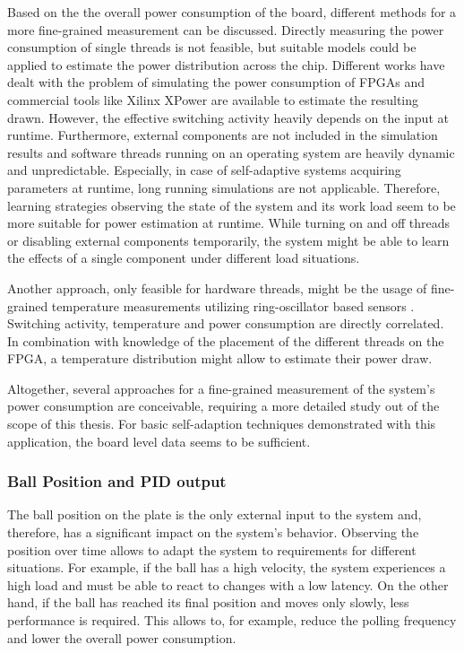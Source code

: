 Based on the the overall power consumption of the board, different methods for
a more fine-grained measurement can be discussed. Directly measuring the power
consumption of single threads is not feasible, but suitable models could be
applied to estimate the power distribution across the chip. Different works
have dealt with the problem of simulating the power consumption of \acp{FPGA}
\citep{DeTu05,JeCa11} and commercial tools like Xilinx XPower are available to
estimate the resulting drawn. However, the effective switching activity
heavily depends on the input at runtime. Furthermore, external components are
not included in the simulation results and software threads running on an
operating system are heavily dynamic and unpredictable. Especially, in case of
self-adaptive systems acquiring parameters at runtime, long running
simulations are not applicable. Therefore, learning strategies observing the
state of the system and its work load seem to be more suitable for power
estimation at runtime. While turning on and off threads or disabling external
components temporarily, the system might be able to learn the effects of a
single component under different load situations.

Another approach, only feasible for hardware threads, might be the usage of
fine-grained temperature measurements utilizing ring-oscillator based sensors
\citep{RAH12,JJR13}. Switching activity, temperature and power consumption are
directly correlated. In combination with knowledge of the placement of the
different threads on the \ac{FPGA}, a temperature distribution might allow to
estimate their power draw.

Altogether, several approaches for a fine-grained measurement of the system's
power consumption are conceivable, requiring a more detailed study out of the
scope of this thesis. For basic self-adaption techniques demonstrated with
this application, the board level data seems to be sufficient.

\subsubsection{Ball Position and \acs{PID} output}
The ball position on the plate is the only external input to the system and,
therefore, has a significant impact on the system's behavior. Observing the
position over time allows to adapt the system to requirements for different
situations. For example, if the ball has a high velocity, the system
experiences a high load and must be able to react to changes with a low
latency. On the other hand, if the ball has reached its final position and
moves only slowly, less performance is required. This allows to, for example,
reduce the polling frequency and lower the overall power consumption.

